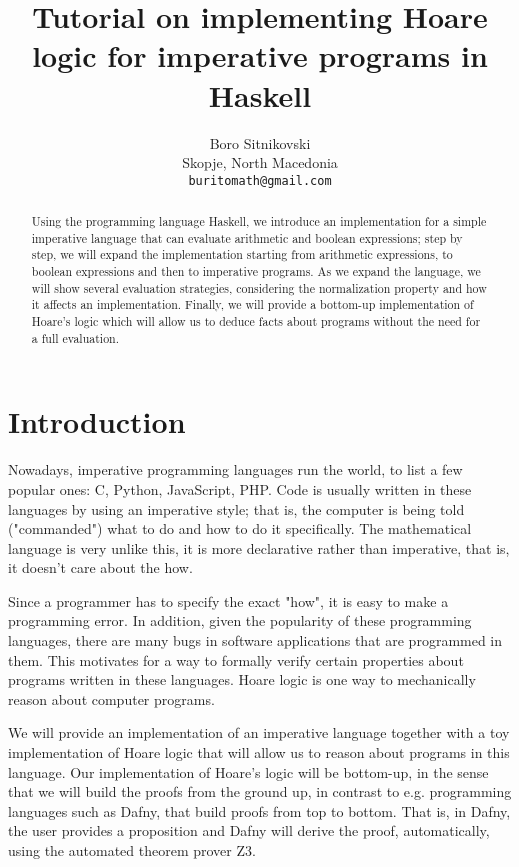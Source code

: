 \documentclass{article}
\title{Tutorial on implementing Hoare logic for imperative programs in Haskell}
\author{
  Boro Sitnikovski \\
  Skopje, North Macedonia \\
  \texttt{buritomath@gmail.com} \\
}
\begin{document}
\maketitle

\begin{abstract}
Using the programming language Haskell, we introduce an implementation for a simple imperative language that can evaluate arithmetic and boolean expressions; step by step, we will expand the implementation starting from arithmetic expressions, to boolean expressions and then to imperative programs. As we expand the language, we will show several evaluation strategies, considering the normalization property and how it affects an implementation. Finally, we will provide a bottom-up implementation of Hoare's logic which will allow us to deduce facts about programs without the need for a full evaluation.
\end{abstract}


\section{Introduction}

Nowadays, imperative programming languages run the world, to list a few popular ones: C, Python, JavaScript, PHP. Code is usually written in these languages by using an imperative style; that is, the computer is being told ("commanded") what to do and how to do it specifically. The mathematical language is very unlike this, it is more declarative rather than imperative, that is, it doesn't care about the how.

Since a programmer has to specify the exact "how", it is easy to make a programming error. In addition, given the popularity of these programming languages, there are many bugs in software applications that are programmed in them. This motivates for a way to formally verify certain properties about programs written in these languages. Hoare logic is one way to mechanically reason about computer programs.

We will provide an implementation of an imperative language together with a toy implementation of Hoare logic that will allow us to reason about programs in this language. Our implementation of Hoare's logic will be bottom-up, in the sense that we will build the proofs from the ground up, in contrast to e.g. programming languages such as Dafny\cite{b1}, that build proofs from top to bottom. That is, in Dafny, the user provides a proposition and Dafny will derive the proof, automatically, using the automated theorem prover Z3\cite{b2}.
\end{document}
